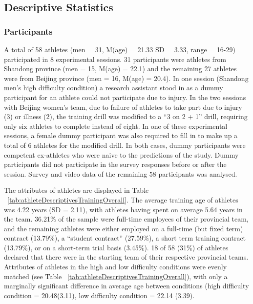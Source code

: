 \subsection{Descriptive Statistics}

\subsubsection{Participants}

A total of 58 athletes (men = 31, M(age) = 21.33 SD = 3.33, range = 16-29) participated in 8 experimental sessions. 31 participants were athletes from Shandong province (men = 15, M(age) = 22.1) and the remaining 27 athletes were from Beijing province (men = 16, M(age) = 20.4).  In one session (Shandong men's high difficulty condition) a research assistant stood in as a dummy participant for an athlete could not participate due to injury.  In the two sessions with Beijing women's team, due to failure of athletes to take part due to injury (3) or illness (2), the training drill was modified to a ``3 on 2 + 1'' drill, requiring only six athletes to complete instead of eight. In one of these experimental sessions, a female dummy participant was also required to fill in to make up a total of 6 athletes for the modified drill.  In both cases, dummy participants were competent ex-athletes who were naive to the predictions of the study.  Dummy participants did not participate in the survey responses before or after the session. Survey and video data of the remaining 58 participants was analysed.



The attributes of athletes are displayed in Table ~\ref{tab:athleteDescriptivesTrainingOverall}. The average training age of athletes was 4.22 years (SD = 2.11), with athletes having spent on average 5.64 years in the team. 36.21\% of the sample were full-time employees of their provincial team, and the remaining athletes were either employed on a full-time (but fixed term) contract
(13.79\%), a ``student contract'' (27.59\%), a short term training contract (13.79\%), or on a short-term trial basis (3.45\%).  18 of 58 (31\%) of athletes declared that there were in the starting team of their respective provincial teams.
Attributes of athletes in the high and low difficulty conditions were evenly matched (see Table ~\ref{tab:athleteDescriptivesTrainingOverall}), with only a marginally significant difference in average age between conditions (high difficulty condition = 20.48(3.11), low difficulty condition = 22.14 (3.39).

